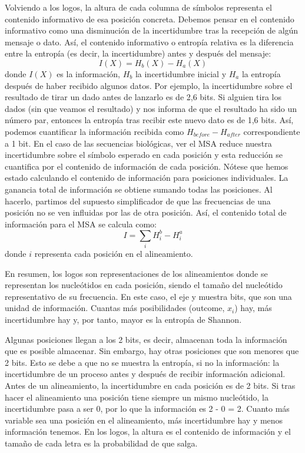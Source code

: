 Volviendo a los logos, la altura de cada columna de símbolos representa el contenido informativo de esa posición concreta. Debemos pensar en el contenido informativo como una disminución de la incertidumbre tras la recepción de algún mensaje o dato. Así, el contenido informativo o entropía relativa es la diferencia entre la entropía (es decir, la incertidumbre) antes y después del mensaje:
$$I(X) = H_b(X) - H_a(X)$$
donde $I(X)$ es la información, $H_b$ la incertidumbre inicial y $H_a$ la entropía después de haber recibido algunos datos.
Por ejemplo, la incertidumbre sobre el resultado de tirar un dado antes de lanzarlo es de 2,6 bits. Si alguien tira los dados (sin que veamos el resultado) y nos informa de que el resultado ha sido un número par, entonces la entropía tras recibir este nuevo dato es de 1,6 bits. Así, podemos cuantificar la información recibida como $H_{before} - H_{after}$ correspondiente a 1 bit. En el caso de las secuencias biológicas, ver el MSA reduce nuestra incertidumbre sobre el símbolo esperado en cada posición y esta reducción se cuantifica por el contenido de información de cada posición. Nótese que hemos estado calculando el contenido de información para posiciones individuales. La ganancia total de información se obtiene sumando todas las posiciones. Al hacerlo, partimos del supuesto simplificador de que las frecuencias de una posición no se ven influidas por las de otra posición. Así, el contenido total de información para el MSA se calcula como:
$$I = \sum_i H_i^b - H_i^a$$
donde $i$ representa cada posición en el alineamiento.

\begin{table}[htbp]
\begin{mdframed}[backgroundcolor=black!10]
En resumen, los logos son representaciones de los alineamientos donde se representan los nucleótidos en cada posición, siendo el tamaño del nucleótido representativo de su frecuencia. En este caso, el eje y muestra bits, que son una unidad de información. Cuantas más posibilidades (outcome, $x_i$) hay, más incertidumbre hay y, por tanto, mayor es la entropía de Shannon. 

Algunas posiciones llegan a los 2 bits, es decir, almacenan toda la información que es posible almacenar. Sin embargo, hay otras posiciones que son menores que 2 bits. Esto se debe a que no se muestra la entropía, si no la información: la incertidumbre de un proceso antes y después de recibir información adicional. Antes de un alineamiento, la incertidumbre en cada posición es de 2 bits. Si tras hacer el alineamiento una posición tiene siempre un mismo nucleótido, la incertidumbre pasa a ser 0, por lo que la información es 2 - 0 = 2. Cuanto más variable sea una posición en el alineamiento, más incertidumbre hay y menos información tenemos. En los logos, la altura es el contenido de información y el tamaño de cada letra es la probabilidad de que salga.
\end{mdframed}
\end{table}

